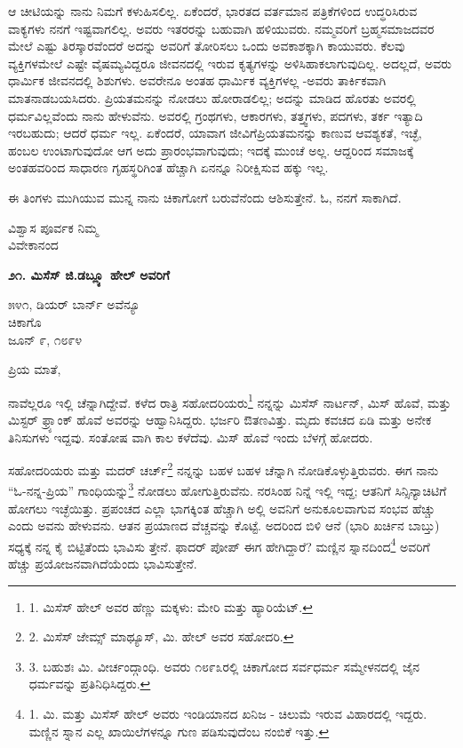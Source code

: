 ಆ ಚೀಟಿಯನ್ನು ನಾನು ನಿಮಗೆ ಕಳುಹಿಸಲಿಲ್ಲ. ಏಕೆಂದರೆ, ಭಾರತದ ವರ್ತಮಾನ ಪತ್ರಿಕೆಗಳಿಂದ ಉದ್ಧರಿಸಿರುವ ವಾಕ್ಯಗಳು ನನಗೆ ಇಷ್ಟವಾಗಲಿಲ್ಲ. ಅವರು ಇತರರನ್ನು ಬಹುವಾಗಿ ಹಳಿಯುವರು. ನಮ್ಮವರಿಗೆ ಬ್ರಹ್ಮಸಮಾಜದವರ ಮೇಲೆ ಎಷ್ಟು ತಿರಸ್ಕಾರವೆಂದರೆ ಅದನ್ನು ಅವರಿಗೆ ತೋರಿಸಲು ಒಂದು ಅವಕಾಶಕ್ಕಾಗಿ ಕಾಯುವರು. ಕೆಲವು ವ್ಯಕ್ತಿಗಳಮೇಲೆ ಎಷ್ಟೇ ವೈಷಮ್ಯವಿದ್ದರೂ ಜೀವನದಲ್ಲಿ ಇರುವ ಕೃತ್ಯಗಳನ್ನು ಅಳಿಸಿಹಾಕಲಾಗುವುದಿಲ್ಲ. ಅದಲ್ಲದೆ, ಅವರು ಧಾರ್ಮಿಕ ಜೀವನದಲ್ಲಿ ಶಿಶುಗಳು. ಅವರೇನೂ ಅಂತಹ ಧಾರ್ಮಿಕ ವ್ಯಕ್ತಿಗಳಲ್ಲ -ಅವರು ತಾರ್ಕಿಕವಾಗಿ ಮಾತನಾಡಬಯಸಿದರು. ಪ್ರಿಯತಮನನ್ನು ನೋಡಲು ಹೋರಾಡಲಿಲ್ಲ; ಅದನ್ನು ಮಾಡಿದ ಹೊರತು ಅವರಲ್ಲಿ ಧರ್ಮವಿಲ್ಲವೆಂದು ನಾನು ಹೇಳುವೆನು. ಅವರಲ್ಲಿ ಗ್ರಂಥಗಳು, ಆಕಾರಗಳು, ತತ್ತ್ವಗಳು, ಪದಗಳು, ತರ್ಕ ಇತ್ಯಾದಿ ಇರಬಹುದು; ಆದರೆ ಧರ್ಮ ಇಲ್ಲ. ಏಕೆಂದರೆ, ಯಾವಾಗ ಜೀವಿಗೆಪ್ರಿಯತಮನನ್ನು ಕಾಣುವ ಆವಶ್ಯಕತೆ, ಇಚ್ಛೆ, ಹಂಬಲ ಉಂಟಾಗುವುದೋ ಆಗ ಅದು ಪ್ರಾರಂಭವಾಗುವುದು; ಇದಕ್ಕೆ ಮುಂಚೆ ಅಲ್ಲ. ಆದ್ದರಿಂದ ಸಮಾಜಕ್ಕೆ ಅಂತಹವರಿಂದ ಸಾಧಾರಣ ಗೃಹಸ್ಥರಿಗಿಂತ ಹೆಚ್ಚಾಗಿ ಏನನ್ನೂ ನಿರೀಕ್ಷಿಸುವ ಹಕ್ಕು ಇಲ್ಲ.

ಈ ತಿಂಗಳು ಮುಗಿಯುವ ಮುನ್ನ ನಾನು ಚಿಕಾಗೋಗೆ ಬರುವೆನೆಂದು ಆಶಿಸುತ್ತೇನೆ. ಓ, ನನಗೆ ಸಾಕಾಗಿದೆ.

\begin{flushright}
ವಿಶ್ವಾಸ ಪೂರ್ವಕ ನಿಮ್ಮ\\ವಿವೇಕಾನಂದ
\end{flushright}

\begin{center}
\textbf{೨೧. ಮಿಸೆಸ್ ಜಿ.ಡಬ್ಲ್ಯೂ ಹೇಲ್ ಅವರಿಗೆ}
\end{center}

\begin{flushright}
೫೪೧, ಡಿಯರ್ ಬಾರ್ನ್ ಅವೆನ್ಯೂ\\ಚಿಕಾಗೊ\\ಜೂನ್ ೯, ೧೮೯೪
\end{flushright}

ಪ್ರಿಯ ಮಾತೆ,

ನಾವೆಲ್ಲರೂ ಇಲ್ಲಿ ಚೆನ್ನಾಗಿದ್ದೇವೆ. ಕಳೆದ ರಾತ್ರಿ ಸಹೋದರಿಯರು\footnote{1. ಮಿಸೆಸ್ ಹೇಲ್ ಅವರ ಹೆಣ್ಣು ಮಕ್ಕಳು: ಮೇರಿ ಮತ್ತು ಹ್ಯಾರಿಯೆಟ್.} ನನ್ನನ್ನು ಮಿಸೆಸ್ ನಾರ್ಟನ್, ಮಿಸ್ ಹೊವೆ, ಮತ್ತು ಮಿಸ್ಟರ್ ಫ್ರ್ಯಾಂಕ್ ಹೊವೆ ಅವರನ್ನು ಆಹ್ವಾನಿಸಿದ್ದರು. ಭರ್ಜರಿ ಔತಣವಿತ್ತು. ಮೃದು ಕವಚದ ಏಡಿ ಮತ್ತು ಅನೇಕ ತಿನಿಸುಗಳು ಇದ್ದವು. ಸಂತೋಷ ವಾಗಿ ಕಾಲ ಕಳೆದೆವು. ಮಿಸ್ ಹೊವೆ ಇಂದು ಬೆಳಗ್ಗೆ ಹೋದರು.

ಸಹೋದರಿಯರು ಮತ್ತು ಮದರ್ ಚರ್ಚ್\footnote{2. ಮಿಸೆಸ್ ಜೇಮ್ಸ್ ಮಾಥ್ಯೂಸ್, ಮಿ. ಹೇಲ್ ಅವರ ಸಹೋದರಿ.} ನನ್ನನ್ನು ಬಹಳ ಬಹಳ ಚೆನ್ನಾಗಿ ನೋಡಿಕೊಳ್ಳುತ್ತಿರುವರು. ಈಗ ನಾನು “ಓ-ನನ್ನ-ಪ್ರಿಯ” ಗಾಂಧಿಯನ್ನು\footnote{3. ಬಹುಶಃ ಮಿ. ವೀರ್ಚಂದ್ಗಾಂಧಿ. ಅವರು ೧೮೯೩ರಲ್ಲಿ ಚಿಕಾಗೋದ ಸರ್ವಧರ್ಮ ಸಮ್ಮೇಳನದಲ್ಲಿ ಜೈನ ಧರ್ಮವನ್ನು ಪ್ರತಿನಿಧಿಸಿದ್ದರು.} ನೋಡಲು ಹೋಗುತ್ತಿರುವೆನು. ನರಸಿಂಹ ನಿನ್ನೆ ಇಲ್ಲಿ ಇದ್ದ; ಆತನಿಗೆ ಸಿನ್ಸಿನ್ಯಾಚಿಟಿಗೆ ಹೋಗಲು ಇಚ್ಛೆಯಿತ್ತು. ಪ್ರಪಂಚದ ಎಲ್ಲಾ ಭಾಗಕ್ಕಿಂತ ಹೆಚ್ಚಾಗಿ ಅಲ್ಲಿ ಅವನಿಗೆ ಅನುಕೂಲವಾಗುವ ಸಂಭವ ಹೆಚ್ಚು ಎಂದು ಅವನು ಹೇಳುವನು. ಆತನ ಪ್ರಯಾಣದ ವೆಚ್ಚವನ್ನು ಕೊಟ್ಟೆ. ಅದರಿಂದ ಬಿಳಿ ಆನೆ (ಭಾರಿ ಖರ್ಚಿನ ಬಾಬ್ತು) ಸಧ್ಯಕ್ಕೆ ನನ್ನ ಕೈ ಬಿಟ್ಟಿತೆಂದು ಭಾವಿಸು ತ್ತೇನೆ. ಫಾದರ್ ಪೋಪ್ ಈಗ ಹೇಗಿದ್ದಾರೆ? ಮಣ್ಣಿನ ಸ್ನಾನದಿಂದ\footnote{1. ಮಿ. ಮತ್ತು ಮಿಸೆಸ್ ಹೇಲ್ ಅವರು ಇಂಡಿಯಾನದ ಖನಿಜ - ಚಿಲುಮೆ ಇರುವ ವಿಹಾರದಲ್ಲಿ ಇದ್ದರು. ಮಣ್ಣಿನ ಸ್ನಾನ ಎಲ್ಲ ಖಾಯಿಲೆಗಳನ್ನೂ ಗುಣ ಪಡಿಸುವುದೆಂಬ ನಂಬಿಕೆ ಇತ್ತು.} ಅವರಿಗೆ ಹೆಚ್ಚು ಪ್ರಯೋಜನವಾಗಿದೆಯೆಂದು ಭಾವಿಸುತ್ತೇನೆ.

